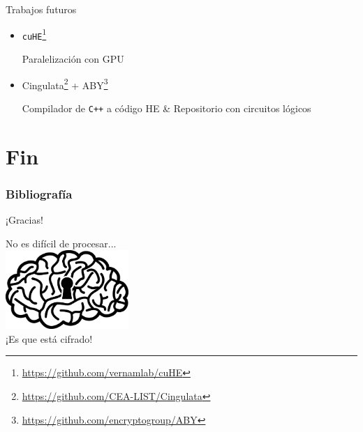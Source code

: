 \documentclass{beamer}
\begin{document}
\begin{frame}{Trabajos futuros}

    \begin{itemize}
        \item \texttt{cuHE}\footnote{\url{https://github.com/vernamlab/cuHE}}
        
        Paralelización con GPU
        
        \item Cingulata\footnote{\url{https://github.com/CEA-LIST/Cingulata}} + ABY\footnote{\url{https://github.com/encryptogroup/ABY}}
        
        Compilador de \texttt{C++} a código HE \& Repositorio con circuitos lógicos
        
        \vspace{15pt}
        
        \begin{figure}[H]
        \end{figure}
        
    \end{itemize}

\end{frame}

\section*{Fin}

\begin{frame}
    \frametitle{Bibliografía}
    \printbibliography
\end{frame}

\begin{frame}{¡Gracias!}

    \centering\large No es difícil de procesar... \\
    \vspace*{15pt}
    \centering\includegraphics[width=0.35\textwidth]{mindcrypt} \\
    \vspace{10pt}
    \centering\huge ¡Es que está cifrado!

\end{frame}
\end{document}
